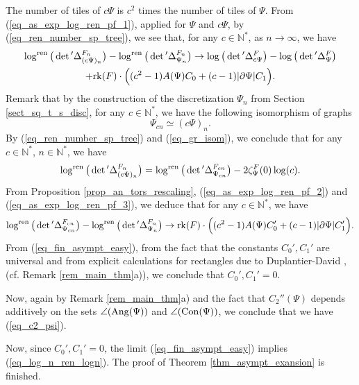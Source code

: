 \documentclass[12pt]{article}
\numberwithin{equation}{section}
\theoremstyle{theorem}
\theoremstyle{definition}
\theoremstyle{remark}
\newcommand{\nat}{\mathbb{N}}
\newcommand{\laplcomp}{\Delta}
\newcommand{\rk}[1]{{\rm{rk}} ( #1 )}
\begin{document}
	The number of tiles of $c \Psi$ is $c^2$ times the number of tiles of $\Psi$.
	From (\ref{eq_as_exp_log_ren_pf_1}), applied for $\Psi$ and $c \Psi$, by (\ref{eq_ren_number_sp_tree}), we see that, for any $c \in \nat^*$, as $n \to \infty$, we have
	\begin{multline}\label{eq_as_exp_log_ren_pf_2}
		\log^{{\rm{ren}}} \big(\det{}' \laplcomp_{(c\Psi)_n}^{F_n} \big)
		 - 
		\log^{{\rm{ren}}} \big(\det{}'\laplcomp_{\Psi_n}^{F_n} \big)
		\to
		\log \big( \det{}' \laplcomp_{c\Psi}^{F} \big)
		-
		\log \big( \det{}' \laplcomp_{\Psi}^{F} \big)
		\\
		+
		\rk{F}
		\cdot
		\Big(
		(c^2 - 1)A(\Psi) C_0
		+
		(c-1)|\partial \Psi| C_1
		\Big).
	\end{multline}
	Remark that by the construction of the discretization $\Psi_n$ from Section \ref{sect_sq_t_s_disc}, for any $c \in \nat^*$, we have the following isomorphism of graphs 
	\begin{equation}\label{eq_gr_isom}
		\Psi_{cn} \simeq (c\Psi)_n.
	\end{equation}
	By (\ref{eq_ren_number_sp_tree}) and (\ref{eq_gr_isom}), we conclude that for any $c \in \nat^*$, $n \in \nat^*$, we have
	\begin{equation}\label{eq_as_exp_log_ren_pf_3}
		\log^{{\rm{ren}}} \big(\det{}' \laplcomp_{(c\Psi)_n}^{F_n} \big)
		=
		\log^{{\rm{ren}}} \big(\det{}' \laplcomp_{\Psi_{cn}}^{F_{cn}} \big)
		-
		2 \zeta_{\Psi}^{F}(0) \log(c).
	\end{equation}
	From Proposition \ref{prop_an_tors_rescaling}, (\ref{eq_as_exp_log_ren_pf_2}) and (\ref{eq_as_exp_log_ren_pf_3}), we deduce that for any $c \in \nat^*$, we have
	\begin{equation}\label{eq_fin_asympt_easy}
		\log^{{\rm{ren}}} \big(\det{}' \laplcomp_{\Psi_{cn}}^{F_{cn}} \big)
		 - 
		\log^{{\rm{ren}}} \big(\det{}' \laplcomp_{\Psi_{n}}^{F_n} \big)
		\to
		\rk{F}
		\cdot
		\Big(
			(c^2 - 1)A(\Psi) C_0'
			+
			(c-1)|\partial \Psi| C_1'
		\Big)
		.
	\end{equation}
	From (\ref{eq_fin_asympt_easy}), from the fact that the constants $C_0', C_1'$ are universal and from explicit calculations for rectangles due to Duplantier-David \cite{DuplDav}, (cf. Remark \ref{rem_main_thm}a)), we conclude that $C_0', C_1' = 0$.
	\par 
	Now, again by Remark \ref{rem_main_thm}a) and the fact that $C_2''(\Psi)$ depends additively on the sets $\angle({\rm{Ang}}(\Psi))$ and $\angle({\rm{Con}}(\Psi))$, we conclude that we have (\ref{eq_c2_psi}).
	\par 
	Now, since $C_0', C_1' = 0$, the limit (\ref{eq_fin_asympt_easy}) implies (\ref{eq_log_n_ren_logn}).
	The proof of Theorem \ref{thm_asympt_exansion} is finished.
	
\end{document}

